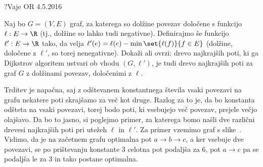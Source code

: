 \begin{naloga}{?}{Vaje OR 4.5.2016}
\begin{vprasanje}
Naj bo $G = (V, E)$ graf,
za katerega so dolžine povezav določene s funkcijo $\ell : E \to \R$
(tj., dolžine so lahko tudi negativne).
Definirajmo še funkcijo $\ell' : E \to \R$ tako,
da velja $\ell'(e) = \ell(e) - \min\set{\ell(f)}{f \in E}$
(dolžine, določene z $\ell'$, so torej nenegativne).
Dokaži ali ovrzi: drevo najkrajših poti,
ki ga Dijkstrov algoritem ustvari ob vhodu $(G, \ell')$,
je tudi drevo najkrajših poti za graf $G$ z dolžinami povezav,
določenimi z $\ell$.
\end{vprasanje}

\begin{odgovor}
Trditev je napačna, saj z odštevanem konstantnega števila vsaki povezavi na grafu 
nekatere poti skrajšamo za več kot druge.
Razlog za to je, da bo konstanta odšteta na vsaki povezavi, 
torej bodo poti, ki vsebujejo več povezav, prejele večjo olajšavo.
Da bo to jasno, si poglejmo primer,
za katerega bomo našli dve različni drevesi najkrajših poti pri utežeh $\ell$ in $\ell'$.
Za primer vzemimo graf s slike~\fig.
Vidimo, da je na začetnem grafu optimalna pot $a \to b \to c$,
a ker vsebuje dve povezavi,
se po prištevanju konstante $3$ celotna pot podaljša za $6$,
pot $a \to c$ pa se podaljša le za $3$ in tako postane optimalna.

\begin{slika}
\pgfslika
{}
\end{slika}

\end{odgovor}
\end{naloga}
